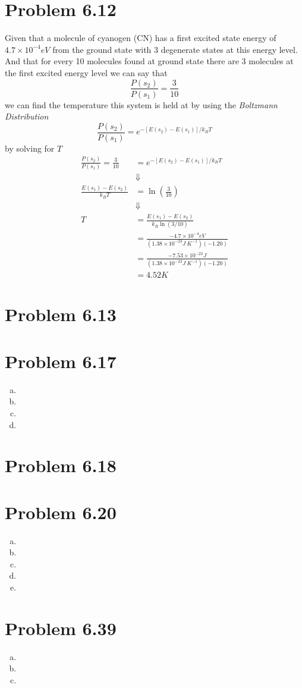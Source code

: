 \documentclass[11pt]{article}
\numberwithin{equation}{section}
\begin{document}


\section{Problem 6.12}
Given that a molecule of cyanogen (CN) has a first excited state energy of $4.7\times10^{-4}\unit{eV}$ from the ground state with 3 degenerate states at this energy level. And that for every 10 molecules found at ground state there are 3 molecules at the first excited energy level we can say that
$$\frac{P(s_2)}{P(s_1)} = \frac{3}{10}$$
we can find the temperature this system is held at by using the \emph{Boltzmann Distribution}
$$\frac{P(s_2)}{P(s_1)} = e^{-[E(s_2)-E(s_1)]/k_BT}$$
by solving for $T$
\begin{align*}
\frac{P(s_2)}{P(s_1)} = \frac{3}{10} &= e^{-[E(s_2)-E(s_1)]/k_BT}\\
&\Downarrow\\
\frac{E(s_1)-E(s_2)}{k_BT} &= \ln\left(\frac{3}{10}\right)\\
&\Downarrow\\
T &= \frac{E(s_1)-E(s_2)}{k_B\ln(3/10)}\\
&= \frac{-4.7\times10^{-4}\unit{eV}}{(1.38\times10^{-23}\unit{J\ K^{-1}})(-1.20)}\\
&= \frac{-7.53\times10^{-23}\unit{J}}{(1.38\times10^{-23}\unit{J\ K^{-1}})(-1.20)}\\
&= 4.52\unit{K}
\end{align*}


\section{Problem 6.13}

\section{Problem 6.17}
\begin{enumerate}[(a)]
\item
\item
\item
\item
\end{enumerate}

\section{Problem 6.18}
\section{Problem 6.20}
\begin{enumerate}[(a)]
\item
\item
\item
\item
\item
\end{enumerate}

\section{Problem 6.39}
\begin{enumerate}[(a)]
\item
\item
\item
\end{enumerate}
\end{document}
